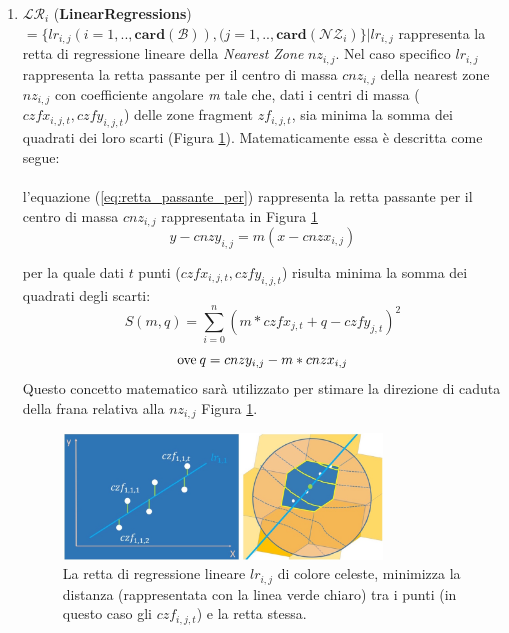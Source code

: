 \begin{enumerate}
	\item \textbf{$ \mathcal{LR}_i $} (\textbf{LinearRegressions}) $ = \{lr_{i,j}(i=1,..,\mathbf{card}(\mathcal{B})),(j=1,..,\mathbf{card}(\mathcal{NZ}_i)\} | lr_{i,j} $ rappresenta la retta di regressione lineare della \textit{Nearest Zone} $nz_{i,j}$. Nel caso specifico $lr_{i,j} $ rappresenta la retta passante per il centro di massa $cnz_{i,j}$ della nearest zone $nz_{i,j}$ con coefficiente angolare \textit{m} tale che, dati i centri di massa ($czfx_{i,j,t}, czfy_{i,j,t}$)  delle zone fragment $zf_{i,j,t}$,  sia minima la somma dei quadrati dei loro scarti (Figura \ref{linear_regression}). Matematicamente essa è descritta come segue:\\
	\\
	l'equazione (\ref{eq:retta_passante_per}) rappresenta la retta passante per il centro di massa $cnz_{i,j}$ rappresentata in Figura \ref{linear_regression}
	\begin{equation}\label{eq:retta_passante_per}
		y - cnzy_{i,j} = m(x-cnzx_{i,j})
	\end{equation}
	
	per la quale dati $t$ punti ($czfx_{i,j,t}, czfy_{i,j,t}$) risulta minima la somma dei quadrati degli scarti:
	\begin{equation}\label{eq:somma_degli_scarti}
		S(m, q) = \sum_{i=0}^n (m*czfx_{j,t} + q - czfy_{j,t})^2 
	\end{equation}
	\begin{equation}
		\textnormal{ove}\: q = cnzy_{i,j} - m*cnzx_{i,j}
	\end{equation}
	Questo concetto matematico sarà utilizzato per stimare la direzione di caduta della frana relativa alla $nz_{i,j}$ Figura \ref{linear_regression}.
	
	
	\begin{figure}[h]
		\centering
		\includegraphics[width=0.8\textwidth]{images/linear_regression}
		\caption{La retta di regressione lineare $lr_{i,j}$ di colore celeste, minimizza la distanza (rappresentata con la linea verde chiaro) tra i punti (in questo caso gli $czf_{i,j,t}$) e la retta stessa.}
		\label{linear_regression}
	\end{figure}
	

\end{enumerate}
